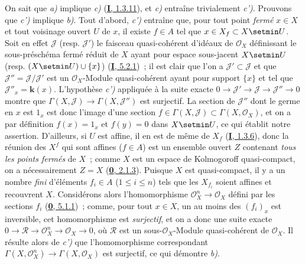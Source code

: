 On sait que \emph{a)} implique \emph{c)} (\hyperref[I.1.3.11-fr]{\textbf{I}, 1.3.11}), et \emph{c)}
entraîne trivialement \emph{c')}. Prouvons que \emph{c')} implique \emph{b)}. Tout d'abord, \emph{c')}
entraîne que, pour tout point \emph{fermé} $x\in X$ et tout voisinage ouvert $U$ de
$x$, il existe $f\in A$ tel que $x\in X_f\subset X\setmin U$. Soit en effet
$\mathcal{J}$ (resp. $\mathcal{J}'$) le faisceau quasi-cohérent d'idéaux de
$\mathcal{O}_X$ définissant le sous-préschéma fermé réduit de $X$ ayant pour
espace sous-jacent $X\setmin U$ (resp. $(X\setmin U)\cup\{x\}$)
(\hyperref[I.5.2.1-fr]{\textbf{I}, 5.2.1})~; il est clair que l'on a
$\mathcal{J}'\subset\mathcal{J}$ et que
$\mathcal{J}''=\mathcal{J}/\mathcal{J}'$ est un $\mathcal{O}_X$-Module
quasi-cohérent ayant pour support $\{x\}$ et tel que
$\mathcal{J}''_x=\boldsymbol{k}(x)$. L'hypothèse \emph{c')} appliquée à la suite exacte
$0\to\mathcal{J}'\to\mathcal{J}\to\mathcal{J}''\to0$ montre que
$\Gamma(X,\mathcal{J})\to\Gamma(X,\mathcal{J}'')$ est surjectif. La section
de $\mathcal{J}''$ dont le germe en $x$ est $1_x$ est donc l'image d'une
section $f\in\Gamma(X,\mathcal{J})\subset\Gamma(X,\mathcal{O}_X)$, et on a
par définition $f(x)=1_x$ et $f(y)=0$ dans $X\setmin U$, ce qui établit notre
assertion. D'ailleurs, si $U$ est affine, il en est de même de $X_f$
(\hyperref[I.1.3.6-fr]{\textbf{I}, 1.3.6}), donc la réunion des $X^f$ qui sont affines
($f\in A$) est un ensemble ouvert $Z$ contenant \emph{tous les points fermés} de
$X$~; comme $X$ est un espace de Kolmogoroff quasi-compact, on a
nécessairement $Z=X$ (\hyperref[0.2.1.3-fr]{\textbf{0}, 2.1.3}). Puisque $X$ est
quasi-compact, il y a un nombre \emph{fini} d'éléments $f_i\in A$
($1\leq i\leq n$) tels que les $X_{f_i}$ soient affines et recouvrent $X$.
Considérons alors l'homomorphisme $\mathcal{O}_X^n\to\mathcal{O}_X$ défini
par les sections $f_i$ (\hyperref[0.5.1.1-fr]{\textbf{0}, 5.1.1})~; comme, pour tout
$x\in X$, un au moins des $(f_i)_x$ est inversible, cet homomorphisme est
\emph{surjectif}, et on a donc une suite exacte
$0\to\mathcal{R}\to\mathcal{O}_X^n\to\mathcal{O}_X\to0$, où $\mathcal{R}$
est un sous-$\mathcal{O}_X$-Module quasi-cohérent de $\mathcal{O}_X$. Il
résulte alors
de \emph{c')} que l'homomorphisme correspondant
$\Gamma(X,\mathcal{O}_X^n)\to\Gamma(X,\mathcal{O}_X)$ est surjectif, ce qui
démontre \emph{b)}.

